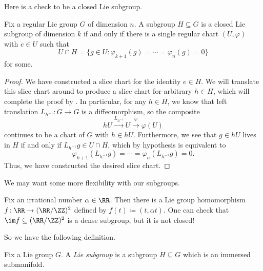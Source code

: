 \documentclass[../notes.tex]{subfiles}
\begin{document}
Here is a check to be a closed Lie subgroup.
\begin{lemma} \label{lem:one-slice-subgroup}
	Fix a regular Lie group $G$ of dimension $n$. A subgroup $H\subseteq G$ is a closed Lie subgroup of dimension $k$ if and only if there is a single regular chart $(U,\varphi)$ with $e\in U$ such that
	\[U\cap H=\{g\in U:\varphi_{k+1}(g)=\cdots=\varphi_n(g)=0\}\]
	for some.
\end{lemma}
\begin{proof}
	We have constructed a slice chart for the identity $e\in H$. We will translate this slice chart around to produce a slice chart for arbitrary $h\in H$, which will complete the proof by \cite[Theorem~5.8]{lee-manifolds}. In particular, for any $h\in H$, we know that left translation $L_{h^{-1}}\colon G\to G$ is a diffeomorphism, so the composite
	\[hU\stackrel{L_{h^{-1}}}\to U\stackrel{\varphi}\to\varphi(U)\]
	continues to be a chart of $G$ with $h\in hU$. Furthermore, we see that $g\in hU$ lives in $H$ if and only if $L_{h^{-1}}g\in U\cap H$, which by hypothesis is equivalent to
	\[\varphi_{k+1}\left(L_{h^{-1}}g\right)=\cdots=\varphi_n\left(L_{h^{-1}}g\right)=0.\]
	Thus, we have constructed the desired slice chart.
\end{proof}
We may want some more flexibility with our subgroups.
\begin{example}
	Fix an irrational number $\alpha\in\RR$. Then there is a Lie group homomorphism $f\colon\RR\to(\RR/\ZZ)^2$ defined by $f(t)\coloneqq(t,\alpha t)$. One can check that $\im f\subseteq(\RR/\ZZ)^2$ is a dense subgroup, but it is not closed!
\end{example}
So we have the following definition.
\begin{definition}
	Fix a Lie group $G$. A \textit{Lie subgroup} is a subgroup $H\subseteq G$ which is an immersed submanifold.
\end{definition}
\end{document}
